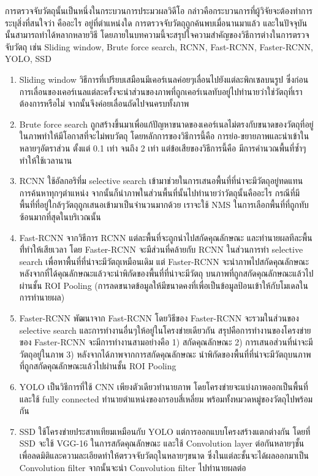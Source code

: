 การตรวจจับวัตถุนั้นเป็นหนึ่งในกระบวนการประมวผลวิดีโอ\textsuperscript{\cite{object_detection}} กล่าวคือกระบวนการที่ผู้วิจัยจะต้องทำการระบุสิ่งที่สนใจว่า คืออะไร อยู่ที่ตำแหน่งใด การตรวจจับวัตถุถูกค้นพบเมื่อนานมาแล้ว 
และในปัจจุบันนั้นสามารถทำได้หลากหลายวิธี โดยภายในบทความนี้จะสรุปใจความสำคัญของวิธีการต่างในการตรวจจับวัตถุ เช่น Sliding window, Brute force search, RCNN, 
Fast-RCNN, Faster-RCNN, YOLO, SSD 
\begin{enumerate}
	\item Sliding window วิธีการที่เปรียบเสมือนมีเคอร์เนลค่อยๆเลื่อนไปยังแต่ละพิกเซลบนรูป ซึ่งก่อนการเลื่อนของเคอร์เนลแต่ละครั้งจะนำส่วนของภาพที่ถูกเคอร์เนลทับอยู่ไปทำนายว่าใช่วัตถุที่เราต้องการหรือไม่ 
	จากนั้นจึงค่อยเลื่อนถัดไปจนครบทั้งภาพ
	\item Brute force search ถูกสร้างขึ้นมาเพื่อแก้ปัญหาขนาดของเคอร์เนลไม่ตรงกับขนาดของวัตถุที่อยู่ในภาพทำให้มีโอกาสที่จะไม่พบวัตถุ โดยหลักการของวิธีการนี้คือ 
	การย่อ-ขยายภาพและนำเข้าในหลายๆอัตราส่วน ตั้งแต่ 0.1 เท่า จนถึง 2 เท่า แต่ข้อเสียของวิธีการนี้คือ มีการคำนวณพื้นที่ซ้ำๆทำให้ใช้เวลานาน
	\item RCNN ใช้อัลกอริทึ่ม selective search เข้ามาช่วยในการเสนอพื้นที่ที่น่าจะมีวัตถุอยู่ทดแทนการค้นหาทุกๆตำแหน่ง จากนั้นก็นำภาพในส่วนพื้นที่นั้นไปทำนายว่าวัตถุนั้นคืออะไร 
	กรณีที่มีพื้นที่ที่อยู่ใกล้ๆวัตถุถูกเสนอเข้ามาเป็นจำนวนมากด้วย เราจะใช้ NMS ในการเลือกพื้นที่ที่ถูกทับซ้อนมากที่สุดในบริเวณนั้น
	\item Fast-RCNN จากวิธีการ RCNN แต่ละพื้นที่จะถูกนำไปสกัดคุณลักษณะ และทำนายผลทีละพื้นที่่ทำให้เสียเวลา โดย Faster-RCNN จะมีส่วนที่คล้ายกับ RCNN ในส่วนการทำ 
	selective search เพื่อหาพื้นที่ที่น่าจะมีวัตถุเหมือนเดิม แต่ Faster-RCNN จะนำภาพไปสกัดคุณลักษณะ หลังจากที่ได้คุณลักษณะแล้วจะนำพิกัดของพื้นที่ที่น่าจะมีวัตถุ 
	บนภาพที่ถูกสกัดคุณลักษณะแล้วไปผ่านชั้น ROI Pooling (การลดขนาดข้อมูลให้มีขนาดคงที่เพื่อเป็นข้อมูลป้อนเข้าให้กับโมเดลในการทำนายผล)
	\item Faster-RCNN พัฒนาจาก Fast-RCNN โดยวิธีของ Faster-RCNN จะรวมในส่วนของ selective search และการทำงานอื่นๆให้อยู่ในโครงข่ายเดียวกัน 
	สรุปคือการทำงานของโครงข่ายของ Faster-RCNN จะมีการทำงานสามอย่างคือ 1) สกัดคุณลักษณะ 2) การเสนอส่วนที่น่าจะมีวัตถุอยู่ในภาพ 3) หลังจากได้ภาพจากการสกัดคุณลักษณะ 
	นำพิกัดของพื้นที่ที่น่าจะมีวัตถุบนภาพที่ถูกสกัดคุณลักษณะแล้วไปผ่านชั้น ROI Pooling
	\item YOLO เป็นวิธีการที่ใช้ CNN เพียงตัวเดียวทำนายภาพ โดยโครงข่ายจะแบ่งภาพออกเป็นพื้นที่ และใช้ fully connected ทำนายตำแหน่งของกรอบสี่เหลี่ยม 
	พร้อมทั้งหมวดหมู่ของวัตถุไปพร้อมกัน 
	\item SSD ใช้โครงข่ายประสาทเทียมเหมือนกับ YOLO แต่การออกแบบโครงสร้างแตกต่างกัน โดยที่ SSD จะใช้ VGG-16 ในการสกัดคุณลักษณะ และใช้ Convolution layer 
	ต่อกันหลายๆชั้นเพื่อลดมิติและความละเอียดทำให้ตรวจจับวัตถุในหลายๆขนาด ซึ่งในแต่ละชั้นจะได้ผลออกมาเป็น Convolution filter จากนั้นจะนำ Convolution filter ไปทำนายผลต่อ
\end{enumerate}